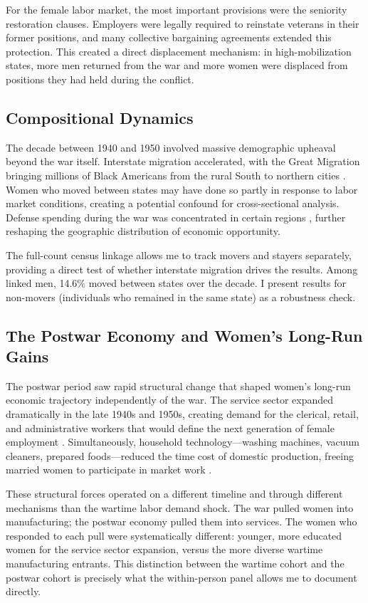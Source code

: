 \documentclass[12pt]{article}
\begin{document}
For the female labor market, the most important provisions were the seniority restoration clauses. Employers were legally required to reinstate veterans in their former positions, and many collective bargaining agreements extended this protection. This created a direct displacement mechanism: in high-mobilization states, more men returned from the war and more women were displaced from positions they had held during the conflict.

\subsection{Compositional Dynamics}

The decade between 1940 and 1950 involved massive demographic upheaval beyond the war itself. Interstate migration accelerated, with the Great Migration bringing millions of Black Americans from the rural South to northern cities \citep{collins2014great, boustan2010was}. Women who moved between states may have done so partly in response to labor market conditions, creating a potential confound for cross-sectional analysis. Defense spending during the war was concentrated in certain regions \citep{fishback2005did, jaworski2017wwii}, further reshaping the geographic distribution of economic opportunity.

The full-count census linkage allows me to track movers and stayers separately, providing a direct test of whether interstate migration drives the results. Among linked men, 14.6\% moved between states over the decade. I present results for non-movers (individuals who remained in the same state) as a robustness check.

\subsection{The Postwar Economy and Women's Long-Run Gains}

The postwar period saw rapid structural change that shaped women's long-run economic trajectory independently of the war. The service sector expanded dramatically in the late 1940s and 1950s, creating demand for the clerical, retail, and administrative workers that would define the next generation of female employment \citep{goldin2006quiet}. Simultaneously, household technology---washing machines, vacuum cleaners, prepared foods---reduced the time cost of domestic production, freeing married women to participate in market work \citep{greenwood2005engines}.

These structural forces operated on a different timeline and through different mechanisms than the wartime labor demand shock. The war pulled women into manufacturing; the postwar economy pulled them into services. The women who responded to each pull were systematically different: younger, more educated women for the service sector expansion, versus the more diverse wartime manufacturing entrants. This distinction between the wartime cohort and the postwar cohort is precisely what the within-person panel allows me to document directly.
\end{document}
